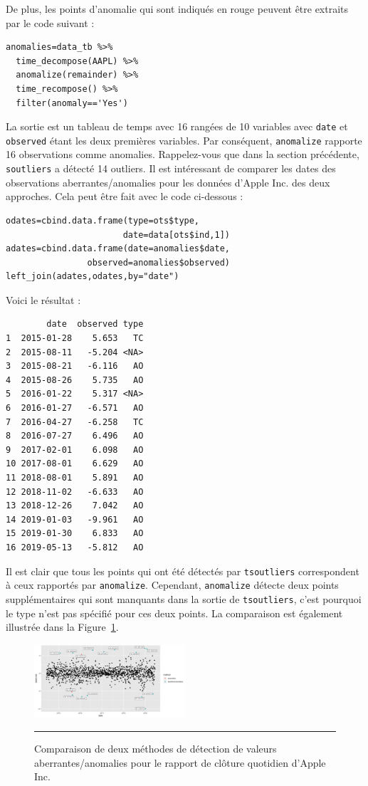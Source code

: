 \afterpage{\FloatBarrier}
De plus, les points d'anomalie qui sont indiqués en rouge peuvent être extraits par le code suivant :
\begin{verbatim}
anomalies=data_tb %>% 
  time_decompose(AAPL) %>%  
  anomalize(remainder) %>%  
  time_recompose() %>%  
  filter(anomaly=='Yes')
\end{verbatim}
La sortie est un tableau de temps avec 16 rangées de 10 variables avec \verb|date| et \verb|observed| étant les deux premières variables. Par conséquent, \verb|anomalize| rapporte 16 observations comme anomalies. Rappelez-vous que dans la section précédente, \verb|soutliers| a détecté 14 outliers. Il est intéressant de comparer les dates des observations aberrantes/anomalies pour les données d'Apple Inc. des deux approches. Cela peut être fait avec le code ci-dessous :
\begin{lstlisting}
odates=cbind.data.frame(type=ots$type,
                       date=data[ots$ind,1])
adates=cbind.data.frame(date=anomalies$date,
                observed=anomalies$observed)
left_join(adates,odates,by="date")
\end{lstlisting}
Voici le résultat :
\begin{lstlisting}
        date  observed type
1  2015-01-28    5.653   TC
2  2015-08-11   -5.204 <NA>
3  2015-08-21   -6.116   AO
4  2015-08-26    5.735   AO
5  2016-01-22    5.317 <NA>
6  2016-01-27   -6.571   AO
7  2016-04-27   -6.258   TC
8  2016-07-27    6.496   AO
9  2017-02-01    6.098   AO
10 2017-08-01    6.629   AO
11 2018-08-01    5.891   AO
12 2018-11-02   -6.633   AO
13 2018-12-26    7.042   AO
14 2019-01-03   -9.961   AO
15 2019-01-30    6.833   AO
16 2019-05-13   -5.812   AO
\end{lstlisting}
Il est clair que tous les points qui ont été détectés par \verb|tsoutliers| correspondent à ceux rapportés par \verb|anomalize|. Cependant, \verb|anomalize| détecte deux points supplémentaires qui sont manquants dans la sortie de \verb|tsoutliers|, c'est pourquoi le type n'est pas spécifié pour ces deux points. La comparaison est également illustrée dans la Figure~\ref{fig:comparemethods}.
\begin{figure}[H]
\centering
\includegraphics[width=0.5\textwidth]{ADOA/Images/comparemethods.png}
\caption[\small Comparaison de deux méthodes de détection de valeurs aberrantes/anomalies pour le rapport de clôture quotidien d'Apple Inc.] {\small Comparaison de deux méthodes de détection de valeurs aberrantes/anomalies pour le rapport de clôture quotidien d'Apple Inc.}
\hrule\label{fig:comparemethods}
\end{figure}

